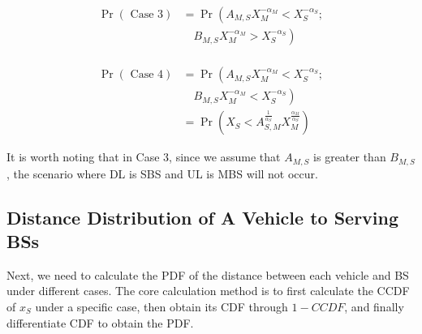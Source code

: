 \documentclass[conference]{IEEEtran}
\begin{document}
\begin{CJK*}{UTF8}{bsmi}
\begin{equation}
\begin{aligned}
\operatorname{Pr}(\text { Case } 3)&=\operatorname{Pr}\left(A_{M, S} X_M^{-\alpha_M}<X_S^{-\alpha_S} ;\right. \\
&\quad \left.B_{M, S} X_M^{-\alpha_M}>X_S^{-\alpha_S}\right) \\
\end{aligned}
\end{equation}




\begin{equation}
\begin{aligned}
\operatorname{Pr}(\text { Case } 4)&=\operatorname{Pr}\left(A_{M, S} X_M^{-\alpha_M}<X_S^{-\alpha_S} ;\right. \\
&\quad \left.B_{M, S} X_M^{-\alpha_M}<X_S^{-\alpha_S}\right) \\
& =\operatorname{Pr}\left(X_S<A_{S, M}^{\frac{1}{\alpha_S}} X_M^{\frac{\alpha_M}{\alpha_S}}\right)
\end{aligned}
\end{equation}


It is worth noting that in Case 3, since we assume that $A_{M, S}$ is greater than $B_{M, S}$, the scenario where DL is SBS and UL is MBS will not occur.


\subsection{Distance Distribution of A Vehicle to Serving BSs}

Next, we need to calculate the PDF of the distance between each vehicle and BS under different cases. The core calculation method is to first calculate the CCDF of $x_S$ under a specific case, then obtain its CDF through $1-CCDF$, and finally differentiate CDF to obtain the PDF.





\end{CJK*}
\end{document}
